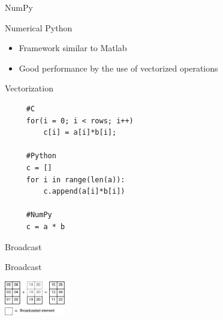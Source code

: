 \documentclass{beamer}
\begin{document}

\begin{frame}{NumPy}
\begin{center}
\begin{Large}
Numerical Python
\end{Large}
\end{center}
\begin{itemize}
  \item Framework similar to Matlab
  \item Good performance by the use of vectorized operations
\end{itemize}

\end{frame}


\begin{frame}[fragile]{Vectorization}
\begin{scriptsize}
\begin{verbatim}
     #C
     for(i = 0; i < rows; i++)
         c[i] = a[i]*b[i];

     #Python
     c = []
     for i in range(len(a)):
         c.append(a[i]*b[i])

     #NumPy
     c = a * b
\end{verbatim}
\end{scriptsize}
\end{frame}


\begin{frame}{Broadcast}
\begin{center}
Broadcast\vspace{15px}

\includegraphics[width=100px]{../gfx/ufunc_broadcast}
\end{center}
\end{frame}

\end{document}
